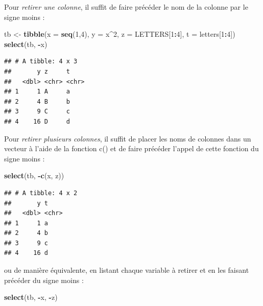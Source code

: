 \documentclass[
  11pt,
]{book}
\newenvironment{Shaded}{\begin{snugshade}}{\end{snugshade}}
\newcommand{\DataTypeTok}[1]{\textcolor[rgb]{0.13,0.29,0.53}{#1}}
\newcommand{\DecValTok}[1]{\textcolor[rgb]{0.00,0.00,0.81}{#1}}
\newcommand{\KeywordTok}[1]{\textcolor[rgb]{0.13,0.29,0.53}{\textbf{#1}}}
\newcommand{\NormalTok}[1]{#1}
\newcommand{\OperatorTok}[1]{\textcolor[rgb]{0.81,0.36,0.00}{\textbf{#1}}}
\newcommand{\StringTok}[1]{\textcolor[rgb]{0.31,0.60,0.02}{#1}}
\numberwithin{equation}{section}
\numberwithin{countremarque}{section}
\begin{document}
Pour \emph{retirer une colonne}, il suffit de faire précéder le nom de la colonne par le signe moins :

\begin{Shaded}
\begin{Highlighting}[]
\NormalTok{tb \textless{}{-}}\StringTok{ }\KeywordTok{tibble}\NormalTok{(}\DataTypeTok{x =} \KeywordTok{seq}\NormalTok{(}\DecValTok{1}\NormalTok{,}\DecValTok{4}\NormalTok{), }\DataTypeTok{y =}\NormalTok{ x}\OperatorTok{\^{}}\DecValTok{2}\NormalTok{, }\DataTypeTok{z =}\NormalTok{ LETTERS[}\DecValTok{1}\OperatorTok{:}\DecValTok{4}\NormalTok{], }\DataTypeTok{t =}\NormalTok{ letters[}\DecValTok{1}\OperatorTok{:}\DecValTok{4}\NormalTok{])}
\KeywordTok{select}\NormalTok{(tb, }\OperatorTok{{-}}\NormalTok{x)}
\end{Highlighting}
\end{Shaded}

\begin{lstlisting}
## # A tibble: 4 x 3
##       y z     t    
##   <dbl> <chr> <chr>
## 1     1 A     a    
## 2     4 B     b    
## 3     9 C     c    
## 4    16 D     d
\end{lstlisting}

Pour \emph{retirer plusieurs colonnes}, il suffit de placer les noms de colonnes dans un vecteur à l'aide de la fonction c() et de faire précéder l'appel de cette fonction du signe moins :

\begin{Shaded}
\begin{Highlighting}[]
\KeywordTok{select}\NormalTok{(tb, }\OperatorTok{{-}}\KeywordTok{c}\NormalTok{(x, z))}
\end{Highlighting}
\end{Shaded}

\begin{lstlisting}
## # A tibble: 4 x 2
##       y t    
##   <dbl> <chr>
## 1     1 a    
## 2     4 b    
## 3     9 c    
## 4    16 d
\end{lstlisting}

ou de manière équivalente, en listant chaque variable à retirer et en les faisant précéder du signe moins :

\begin{Shaded}
\begin{Highlighting}[]
\KeywordTok{select}\NormalTok{(tb, }\OperatorTok{{-}}\NormalTok{x, }\OperatorTok{{-}}\NormalTok{z)}
\end{Highlighting}
\end{Shaded}
\end{document}

